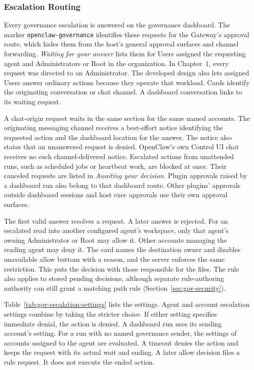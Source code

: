 \subsubsection{Escalation Routing}
\label{sec:gov-escalation-routing}

{\color{red}Every governance escalation is answered on the governance dashboard.
The marker \texttt{openclaw-governance} identifies these requests for the
Gateway's approval route, which hides them from the host's general approval
surfaces and channel forwarding. \textit{Waiting for your answer} lists them
for Users assigned the requesting agent and Administrators or Root in the
organization. In Chapter~1, every request was directed to an Administrator. The developed
design also lets assigned Users answer ordinary actions because they operate
that workload. Cards identify the originating conversation or chat channel.
A dashboard conversation links to its waiting request.

A chat-origin request waits in the same section for the same named accounts.
The originating messaging channel receives a best-effort notice identifying
the requested action and the dashboard location for the answer. The notice
also states that an unanswered request is denied.
OpenClaw's own Control UI chat receives no such channel-delivered notice.
Escalated actions from unattended runs, such as scheduled jobs or heartbeat work,
are blocked at once. Their canceled requests are listed in \textit{Awaiting your decision}.
Plugin approvals raised by a dashboard run also belong to that dashboard
route. Other plugins' approvals outside dashboard sessions and host exec
approvals use their own approval surfaces.

The first valid answer resolves a request. A later answer is rejected. For an
escalated read into another configured agent's workspace, only that agent's
owning Administrator or Root may allow it. Other accounts managing the reading
agent may deny it. The card names the destination owner and disables unavailable
allow buttons with a reason, and the server enforces the same restriction.
This puts the decision with those responsible for the files. The rule also
applies to stored pending decisions, although separate rule-authoring
authority can still grant a matching path rule
(Section~\ref{sec:gov-security}).

Table~\ref{tab:gov-escalation-settings} lists the settings. Agent and account
escalation settings combine by taking the stricter choice. If either setting
specifies immediate denial, the action is denied. A dashboard run uses its
sending account's setting. For a run with no named governance sender, the
settings of accounts assigned to the agent are evaluated.
A timeout denies the action and keeps the request with its actual wait and
ending. A later allow decision files a rule request. It does not execute the
ended action.}

